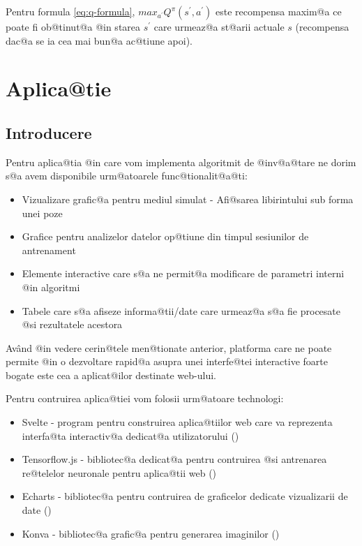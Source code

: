 Pentru formula \ref{eq:q-formula}, $max_{a^{\prime}} Q^{\pi}(s^{\prime}, a^{\prime})$ este recompensa maxim@a ce poate fi ob@tinut@a @in starea $s^{\prime}$ care urmeaz@a st@arii actuale $s$ (recompensa dac@a se ia cea mai bun@a ac@tiune apoi).

\chapter{Aplica@tie}

\section{Introducere}

Pentru aplica@tia @in care vom implementa algoritmit de @inv@a@tare ne dorim s@a avem disponibile urm@atoarele func@tionalit@a@ti:

\begin{itemize}
	\item Vizualizare grafic@a pentru mediul simulat - Afi@sarea libirintului sub forma unei poze
	\item Grafice pentru analizelor datelor op@tiune din timpul sesiunilor de antrenament
	\item Elemente interactive care s@a ne permit@a modificare de parametri interni @in algoritmi
	\item Tabele care s@a afiseze informa@tii/date care urmeaz@a s@a fie procesate @si rezultatele acestora
\end{itemize}

Av\^ and @in vedere cerin@tele men@tionate anterior, platforma care ne poate permite @in o dezvoltare rapid@a asupra unei interfe@tei interactive foarte bogate este cea a aplicat@ilor destinate web-ului.

Pentru contruirea aplica@tiei vom folosii urm@atoare technologi:

\begin{itemize}
	\item Svelte - program pentru construirea aplica@tiilor web care va reprezenta interfa@ta interactiv@a dedicat@a utilizatorului (\cite{Svelte})
	\item Tensorflow.js - bibliotec@a dedicat@a pentru contruirea @si antrenarea re@telelor neuronale pentru aplica@tii web (\cite{TensorflowJs})
	\item Echarts - bibliotec@a pentru contruirea de graficelor dedicate vizualizarii de date (\cite{Echarts})
	\item Konva - bibliotec@a grafic@a pentru generarea imaginilor (\cite{Konva})
\end{itemize} 

